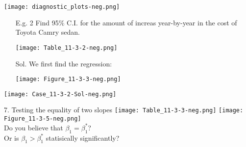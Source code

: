 \begin{frame}[fragile]
\texttt{[image: diagnostic\_plots-neg.png]}
\end{frame}
\begin{frame}
	\begin{enumerate}
		\item[E.g. 2] Find 95\% C.I. for the amount of increas year-by-year in the cost of Toyota Camry sedan. \\[2em]
			\begin{center}
\texttt{[image: Table\_11-3-2-neg.png]}
			\end{center}
	\end{enumerate}
\end{frame}
\begin{frame}

	\begin{enumerate}
		\item[Sol.] We first find the regression:
			\vfill
			\begin{center}
				\texttt{[image: Figure\_11-3-3-neg.png]}
			\end{center}
	\end{enumerate}
\end{frame}
\begin{frame}
\centering
\texttt{[image: Case\_11-3-2-Sol-neg.png]}
\end{frame}
\begin{frame}
	{7. Testing the equality of two slopes}
\centering
\texttt{[image: Table\_11-3-3-neg.png]}
\texttt{[image: Figure\_11-3-5-neg.png]}\\
\vfill
Do you believe that $\beta_1 = \beta_1^*$?\\[2em]
Or is $\beta_1>\beta_1^*$ statisically significantly?
\end{frame}
